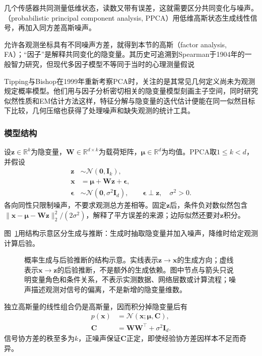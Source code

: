 几个传感器共同测量低维状态，读数又带有误差，这就需要区分共同变化与噪声。（probabilistic principal component analysis, PPCA）用低维高斯状态生成线性信号，再加入同方差高斯噪声。

允许各观测坐标具有不同噪声方差，就得到本节的高斯（factor analysis, FA）；“因子”是解释共同变化的隐变量。其历史可追溯到Spearman于1904年的一般智力研究，但现代多因子模型不等同于当时的心理测量假说

Tipping与Bishop在1999年重新考察PCA时，关注的是其常见几何定义尚未为观测规定概率模型。他们用与因子分析密切相关的隐变量模型刻画主子空间，同时研究似然性质和EM估计方法这样，特征分解与隐变量的迭代估计便能在同一似然目标下比较，几何压缩也获得了处理噪声和缺失观测的统计工具。

\subsubsection{模型结构}
\label{sec:dim-ppca-structure}

设$\bm{z}\in\mathbb{R}^k$为隐变量，$\bm{W}\in\mathbb{R}^{d\times k}$为载荷矩阵，$\bm{\mu}\in\mathbb{R}^d$为均值。PPCA取$1\leq k<d$，并假设
\begin{equation}
\label{eq:dim-ppca-generative}
\begin{aligned}
\bm{z}&\sim\mathcal{N}(\bm{0},\bm{I}_k),\\
\bm{x}&=\bm{\mu}+\bm{W}\bm{z}+\bm{\epsilon},\\
\bm{\epsilon}&\sim\mathcal{N}(\bm{0},\sigma^2\bm{I}_d),
\qquad \bm{\epsilon}\perp\bm{z},\quad \sigma^2>0.
\end{aligned}
\end{equation}
各向同性只限制噪声，不要求观测总方差相等。固定$\bm{z}$后，条件负对数似然包含$\lVert\bm{x}-\bm{\mu}-\bm{W}\bm{z}\rVert_2^2/(2\sigma^2)$，解释了平方误差的来源；边际似然还要对$\bm{z}$积分。

图~\ref{fig:dim-latent-model}用结构示意区分生成与推断：生成时抽取隐变量并加入噪声，降维时给定观测计算后验。
\begin{figure}[htbp]
\centering

\caption{概率生成与后验推断的结构示意。实线表示$\bm{z}\to\bm{x}$的生成方向；虚线表示$\bm{x}\to\bm{z}$的后验推断，不是额外的生成依赖。图中节点与箭头只说明变量角色和条件关系，不表示实测数据、网络层数或计算流程；噪声描述观测对信号的偏离，不是新增的隐变量维数。}
\label{fig:dim-latent-model}
\end{figure}

独立高斯量的线性组合仍是高斯量，因而积分掉隐变量后有
\begin{equation}
\label{eq:dim-ppca-marginal}
\begin{aligned}
p(\bm{x})&=\mathcal{N}(\bm{x};\bm{\mu},\bm{C}),\\
\bm{C}&=\bm{W}\bm{W}^\top+\sigma^2\bm{I}_d.
\end{aligned}
\end{equation}
信号协方差的秩至多为$k$，正噪声保证$\bm{C}$正定，即使经验协方差因样本不足而奇异。

